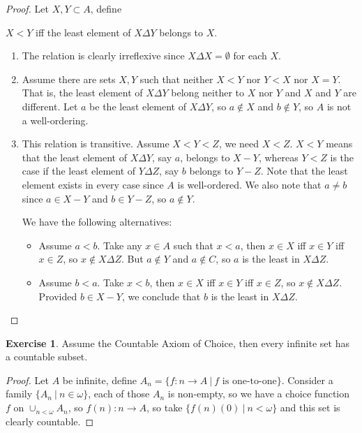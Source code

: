 \documentclass[8pt]{article}
\theoremstyle{definition}
\theoremstyle{definition}
\theoremstyle{definition}
\theoremstyle{definition}
\theoremstyle{definition}
\theoremstyle{definition}
\theoremstyle{definition}
\theoremstyle{definition}
\theoremstyle{definition}
\theoremstyle{definition}
\theoremstyle{definition}
\theoremstyle{definition}
\theoremstyle{definition}
\newtheorem{exercise}{Exercise}[section]
\theoremstyle{definition}
\theoremstyle{question}
\begin{document}
\begin{proof}
  Let $X, Y \subset A$, define
  \begin{center}
    $X < Y$ iff the least element of $X \Delta Y$ belongs to $X$.
  \end{center}

  \begin{enumerate}
  \item The relation is clearly irreflexive since $X \Delta X = \emptyset$ for each $X$.

  \item Assume there are sets $X, Y$ such that neither $X < Y$ nor $Y < X$ nor $X = Y$.
  That is, the least element of $X \Delta Y$ belong neither to $X$ nor $Y$ and $X$ and $Y$ are different.
  Let $a$ be the least element of $X \Delta Y$, so $a \notin X$ and $b \notin Y$, so $A$ is not a well-ordering.

  \item This relation is transitive. Assume $X < Y < Z$, we need $X < Z$. 
  $X < Y$ means that the least element of $X \Delta Y$, say $a$, belongs to $X - Y$, whereas
  $Y < Z$ is the case if the least element of $Y \Delta Z$, say $b$ belongs to $Y - Z$.
  Note that the least element exists in every case since $A$ is well-ordered. 
  We also note that $a \neq b$ since $a \in X - Y$ and $b \in Y - Z$, so $a \notin Y$.

 
  We have the following alternatives:
  \begin{itemize}
    \item Assume $a < b$. Take any $x \in A$ such that $x < a$, then 
    $x \in X$ iff $x \in Y$ iff $x \in Z$, so $x \notin X \Delta Z$. But $a \notin Y$ and $a \notin C$, so $a$ is the least in $X \Delta Z$.
    \item Assume $b < a$. Take $x < b$, then $x \in X$ iff $x \in Y$ iff $x \in Z$, so $x \notin X \Delta Z$.
    Provided $b \in X - Y$, we conclude that $b$ is the least in $X \Delta Z$.
  \end{itemize}
  \end{enumerate}
\end{proof}

\begin{exercise}
  Assume the Countable Axiom of Choice, then every infinite set has a countable subset.
\end{exercise}

\begin{proof}
  Let $A$ be infinite, define $A_n = \{ f : n \to A \: | \: \text{$f$ is one-to-one} \}$. Consider
  a family $\{ A_n \: | \: n \in \omega \}$, each of those $A_n$ is non-empty, so we have a choice function
  $f$ on $\cup_{n < \omega} A_n$, so $f(n) : n \to A$, so take $\{ f(n)(0) \: | \: n < \omega \}$ and this set
  is clearly countable. 
\end{proof}
\end{document}
